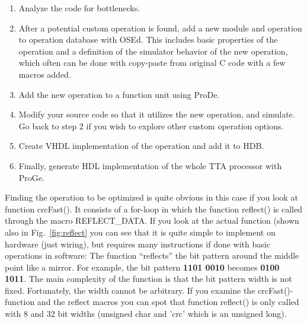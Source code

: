 \documentclass[twoside]{tceusermanual}
\begin{document}
\begin{enumerate}
\item Analyze the code for bottlenecks.

\item After a potential custom operation is found, add a new module and
  operation to operation database with OSEd. This includes basic
  properties of the operation and a definition of the simulator behavior
  of the new operation, which often can be done with copy-paste from
  original C code with a few macros added.

\item Add the new operation to a function unit using ProDe.

\item Modify your source code so that it utilizes the new operation,
  and simulate. Go back to step 2 if you wish to explore other
  custom operation options.

\item Create VHDL implementation of the operation and add it to HDB.

\item Finally, generate HDL implementation of the whole TTA processor with ProGe.
\end{enumerate}


Finding the operation to be optimized is quite obvious in this case if
you look at function crcFast(). It consists of a for-loop in which the
function reflect() is called through the macro REFLECT\_DATA. If you
look at the actual function (shown also in Fig.~\ref{fig:reflect} you
can see that it is quite simple to implement on hardware (just wiring),
but requires many instructions if done with basic operations in software: The
function ``reflects'' the bit pattern around the middle point like a
mirror. For example, the bit pattern \textbf{1101 0010} becomes
\textbf{0100 1011}. The main complexity of the function is that the bit 
pattern width is not fixed. Fortunately, the width cannot be
arbitrary. If you examine the crcFast()-function and the reflect
macros you can spot that function reflect() is only called with 8 and
32 bit widths (unsigned char and 'crc' which is an unsigned long).
\end{document}
